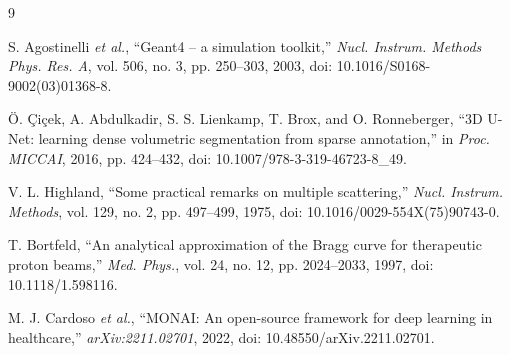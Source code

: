\documentclass[10pt,conference]{IEEEtran}
\begin{document}
\begin{thebibliography}{9}

S. Agostinelli \emph{et al.}, ``Geant4 -- a simulation toolkit,''
\emph{Nucl. Instrum. Methods Phys. Res. A}, vol. 506, no. 3,
pp. 250--303, 2003, doi: 10.1016/S0168-9002(03)01368-8.

{\"O}. {\c C}i{\c c}ek, A. Abdulkadir, S. S. Lienkamp, T. Brox, and
O. Ronneberger, ``3D U-Net: learning dense volumetric segmentation from
sparse annotation,'' in \emph{Proc. MICCAI}, 2016, pp. 424--432,
doi: 10.1007/978-3-319-46723-8\_49.

V. L. Highland, ``Some practical remarks on multiple scattering,''
\emph{Nucl. Instrum. Methods}, vol. 129, no. 2, pp. 497--499, 1975,
doi: 10.1016/0029-554X(75)90743-0.

T. Bortfeld, ``An analytical approximation of the Bragg curve for
therapeutic proton beams,'' \emph{Med. Phys.}, vol. 24, no. 12,
pp. 2024--2033, 1997, doi: 10.1118/1.598116.

M. J. Cardoso \emph{et al.}, ``MONAI: An open-source framework for deep
learning in healthcare,'' \emph{arXiv:2211.02701}, 2022,
doi: 10.48550/arXiv.2211.02701.

\end{thebibliography}
\end{document}
